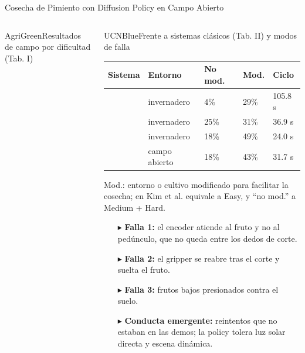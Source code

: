 \documentclass[aspectratio=169,10pt,xcolor={dvipsnames,table}]{beamer}
\newcommand{\CardHeightTall}{46mm}         %
\newcommand{\TabFont}{\fontsize{5.3}{6.4}\selectfont}                    %
\begin{document}
\begin{frame}{Cosecha de Pimiento con Diffusion Policy en Campo Abierto}
\begin{columns}[T, onlytextwidth]
\begin{column}{0.47\textwidth}
\begin{Card}[height=\CardHeightTall, space to=\EspacioLibre]{AgriGreen}{Resultados de campo por dificultad (Tab. I)}
      \end{Card}
    \end{column}
    \begin{column}{0.51\textwidth}
      \begin{Card}[height=\CardHeightTall]{UCNBlue}{Frente a sistemas clásicos (Tab. II) y modos de falla}
        {\TabFont
        \setlength{\tabcolsep}{1.4pt}
        \renewcommand{\arraystretch}{1.12}
        \begin{tabular}{@{}L{21mm} L{14mm} C{10mm} C{9mm} C{10mm}@{}}
          \toprule
          \textbf{Sistema} & \textbf{Entorno} & \textbf{No mod.} & \textbf{Mod.} & \textbf{Ciclo} \\
          \midrule
          \cite{bac2017pepper} & invernadero & 4\% & 29\% & 105.8 s \\
          \cite{lehnert2020pepper} & invernadero & 25\% & 31\% & 36.9 s \\
          \cite{arad2020pepper} & invernadero & 18\% & 49\% & 24.0 s \\
           \cite{kim2025pepper} & campo abierto & 18\% & 43\% & 31.7 s \\
          \bottomrule
        \end{tabular}\par
        \vspace{0.6mm}
        \textcolor{TextDark!80}{Mod.: entorno o cultivo modificado para facilitar la cosecha; en Kim et al. equivale a Easy, y ``no mod.'' a Medium + Hard.}\par
        \vspace{0.8mm}
        \begin{itemize}\setlength{\itemsep}{0.6pt}
          \item[\textcolor{UCNBlue}{$\blacktriangleright$}] \textbf{Falla 1:} el encoder atiende al fruto y no al pedúnculo, que no queda entre los dedos de corte.
          \item[\textcolor{UCNBlue}{$\blacktriangleright$}] \textbf{Falla 2:} el gripper se reabre tras el corte y suelta el fruto.
          \item[\textcolor{UCNBlue}{$\blacktriangleright$}] \textbf{Falla 3:} frutos bajos presionados contra el suelo.
          \item[\textcolor{UCNBlue}{$\blacktriangleright$}] \textbf{Conducta emergente:} reintentos que no estaban en las demos; la policy tolera luz solar directa y escena dinámica.
        \end{itemize}}
      \end{Card}
    \end{column}
  \end{columns}
\end{frame}
\end{document}

